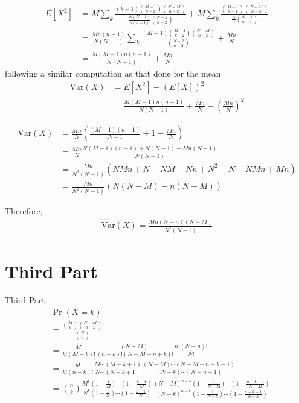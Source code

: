 \documentclass{beamer}
\providecommand{\pr}[1]{\ensuremath{\Pr\left(#1\right)}}
\providecommand{\brak}[1]{\ensuremath{\left(#1\right)}}
\begin{document}
	\begin{frame}
	\begin{align}
		E[X^2] &= M \sum_k \frac{(k-1) \binom{M-1}{k-1} \binom{N-M}{n-k}}{\frac{N(N-1)}{n(n-1)}\binom{N-2}{n-2}} + M \sum_k \frac{\binom{M-1}{k-1} \binom{N-M}{n-k}}{\frac{N}{n} \binom{N-1}{n-1}} \\ 
		&= \frac{Mn(n-1)}{N(N-1)} \sum_k \frac{(M-1) \binom{M-2}{k-2} \binom{N-M}{n-k}}{\binom{N-2}{n-2}} + \frac{Mn}{N} \\
		&= \frac{M(M-1)n(n-1)}{N(N-1)} + \frac{Mn}{N}
	\end{align}
	following a similar computation as that done for the mean
	\begin{align}
		\mathrm{Var}(X) &= E[X^2] - \brak{E[X]}^2 \\
		&= \frac{M(M-1)n(n-1)}{N(N-1)} + \frac{Mn}{N} - \brak{\frac{Mn}{N}}^2
	\end{align}
	\end{frame}
		
	\begin{frame}
	\begin{align}
		\mathrm{Var}(X) &= \frac{Mn}{N} \brak{\frac{(M-1)(n-1)}{N-1} + 1 - \frac{Mn}{N}} \\
		&= \frac{Mn}{N} \frac{N(M-1)(n-1) + N(N-1) - Mn(N-1)}{N(N-1)} \\
		&= \frac{Mn}{N^2(N-1)} \brak{NMn + N - NM - Nn + N^2 - N - NMn + Mn} \\
		&= \frac{Mn}{N^2(N-1)} (N(N-M) - n(N-M))
	\end{align}
	\begin{block}{}
	Therefore,
		\begin{align}
			\mathrm{Var}(X) = \frac{Mn(N-n)(N-M)}{N^2(N-1)}
		\end{align}
	\end{block}
	\end{frame}
	
	\section{Third Part}
	\begin{frame}{Third Part}
	\begin{align}
		&\pr{X=k} \\
		&= \frac{\binom{M}{k} \binom{N-M}{n-k}}{\binom{N}{n}} \\
		&= \frac{M!}{k!(M-k)!} \frac{(N-M)!}{(n-k)!(N-M-n+k)!} \frac{n!(N-n)!}{N!} \\
		&= \frac{n!}{k!(n-k)!} \frac{M\cdots(M-k+1)}{N\cdots(N-k+1)} \frac{(N-M)\cdots(N-M-n+k+1)}{(N-k)\cdots(N-n+1)} \\
		&= \binom{n}{k} \frac{M^k \brak{1-\frac1M} \cdots \brak{1-\frac{k-1}{M}}}{N^k \brak{1-\frac1N} \cdots \brak{1-\frac{k-1}{N}}} \frac{(N-M)^{n-k} \brak{1-\frac{1}{N-M}} \cdots \brak{1-\frac{n-k-1}{N-M}}}{(N-k)^{n-k} \brak{1-\frac{1}{N-k}} \cdots \brak{1-\frac{n-k-1}{N-k}}}
	\end{align}
	\end{frame}
	
\end{document}
